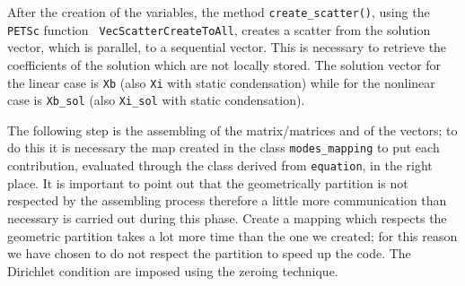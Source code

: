 After the creation of the variables, the method \verb|create_scatter()|, using the \verb|PETSc| function \verb| VecScatterCreateToAll|, creates a scatter from the solution vector, which is parallel, to a sequential vector. This is necessary to retrieve the coefficients of the solution which are not locally stored. The solution vector for the linear case is \verb|Xb| (also \verb|Xi| with static condensation) while for the nonlinear case is \verb|Xb_sol| (also \verb|Xi_sol| with static condensation).
\medskip

The following step is the assembling of the matrix/matrices and of the vectors; to do this it is necessary the map created in the class \verb|modes_mapping| to put each contribution, evaluated through the class derived from \verb|equation|, in the right place. It is important to point out that the geometrically partition is not respected by the assembling process therefore a little more communication than necessary is carried out during this phase. Create a mapping which respects the geometric partition takes a lot more time than the one we created; for this reason we have chosen to do not respect the partition to speed up the code. The Dirichlet condition are imposed using the zeroing technique.
\medskip

